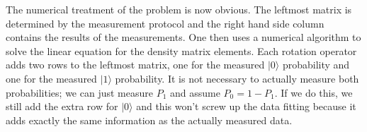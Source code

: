 \documentclass[twocolumn]{article}
\newcommand{\ket}[1]{|#1\rangle}
\begin{document}
The numerical treatment of the problem is now obvious. The leftmost matrix is determined by the measurement protocol and the right hand side column contains the results of the measurements. One then uses a numerical algorithm to solve the linear equation for the density matrix elements. Each rotation operator adds two rows to the leftmost matrix, one for the measured $\ket{0}$ probability and one for the measured $\ket{1}$ probability. It is not necessary to actually measure both probabilities; we can just measure $P_1$ and assume $P_0 = 1-P_1$. If we do this, we still add the extra row for $\ket{0}$ and this won't screw up the data fitting because it adds exactly the same information as the actually measured data.
\end{document}
